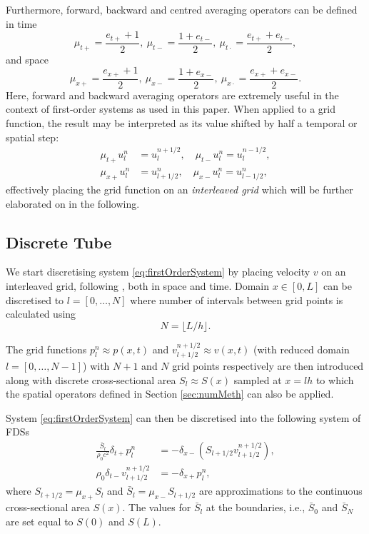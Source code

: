 Furthermore, forward, backward and centred averaging operators can be defined in time
\begin{equation}
    \mu_{t+} = \frac{e_{t+} + 1}{2}, \ \mu_{t-} = \frac{1 + e_{t-}}{2}, \ \mu_{t\cdot} = \frac{e_{t+}+e_{t-}}{2},
\end{equation}
and space
\begin{equation}
    \mu_{x+} = \frac{e_{x+} + 1}{2}, \ \mu_{x-} = \frac{1 + e_{x-}}{2}, \ \mu_{x\cdot} = \frac{e_{x+}+e_{x-}}{2}.
\end{equation}
Here, forward and backward averaging operators are extremely useful in the context of first-order systems as used in this paper. When applied to a grid function, the result may be interpreted as its value shifted by half a temporal or spatial step: 
\begin{align}
    \mu_{t+}u_l^n &= u_l^{n+1/2}, \quad \mu_{t-}u_l^n = u_l^{n-1/2},\\
    \mu_{x+}u_l^n &= u_{l+1/2}^n, \quad \mu_{x-}u_l^n = u_{l-1/2}^n,
\end{align}
effectively placing the grid function on an \textit{interleaved grid} which will be further elaborated on in the following. 

\subsection{Discrete Tube}\label{sec:discSyst}
We start discretising system \eqref{eq:firstOrderSystem} by placing velocity $v$ on an interleaved grid, following \cite{Harrison2018}, both in space and time. Domain $x\in [0, L]$ can be discretised to $l = [0, \hdots, N]$ where number of intervals between grid points is calculated using 
\begin{equation}\label{eq:numberOfIntervals}
    N=\lfloor L/h\rfloor.
\end{equation}

The grid functions $p_l^n \approx p(x,t)$ and $v_{l+1/2}^{n+1/2} \approx v(x,t)$ (with reduced domain $l = [0, \hdots, N-1]$) with $N+1$ and $N$ grid points respectively are then introduced along with discrete cross-sectional area $S_l\approx S(x)$ sampled at $x = lh$ to which the spatial operators defined in Section \ref{sec:numMeth} can also be applied.

System \eqref{eq:firstOrderSystem} can then be discretised into the following system of FDSs
\begin{subequations}\label{eq:FDS}
    \begin{align}
        \frac{\bar S_l}{\rho_0 c^2}\delta_{t+}p_l^n &= -\delta_{x-}(S_{l+1/2}v_{l+1/2}^{n+1/2}),\label{eq:discPressure}\\
        \rho_0 \delta_{t-}v_{l+1/2}^{n+1/2}&=-\delta_{x+}p_l^n,\label{eq:discVelocity}
    \end{align}
\end{subequations}
where $S_{l+1/2} = \mu_{x+}S_l$ and $\bar S_l = \mu_{x-}S_{l+1/2}$ are approximations to the continuous cross-sectional area $S(x)$. The values for $\bar S_l$ at the boundaries, i.e., $\bar S_0$ and $\bar S_N$ are set equal to $S(0)$ and $S(L)$.

